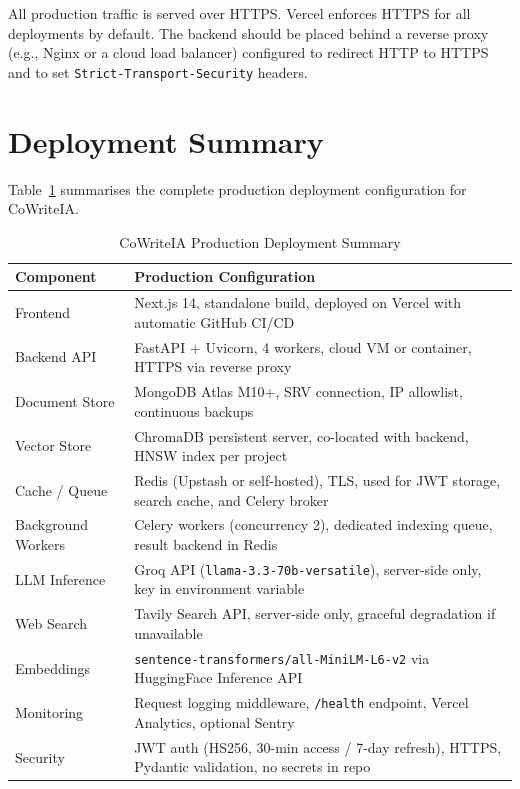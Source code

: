 All production traffic is served over HTTPS. Vercel enforces HTTPS for all deployments by default. The backend should be placed behind a reverse proxy (e.g., Nginx or a cloud load balancer) configured to redirect HTTP to HTTPS and to set \texttt{Strict-Transport-Security} headers.

\section{Deployment Summary}
\label{sec:deployment-summary}

Table~\ref{tab:deployment-summary} summarises the complete production deployment configuration for CoWriteIA.

\begin{table}[H]
\centering
\begin{tabular}{|p{4cm}|p{9.5cm}|}
\hline
\textbf{Component} & \textbf{Production Configuration} \\
\hline
Frontend & Next.js 14, standalone build, deployed on Vercel with automatic GitHub CI/CD \\
\hline
Backend API & FastAPI + Uvicorn, 4 workers, cloud VM or container, HTTPS via reverse proxy \\
\hline
Document Store & MongoDB Atlas M10+, SRV connection, IP allowlist, continuous backups \\
\hline
Vector Store & ChromaDB persistent server, co-located with backend, HNSW index per project \\
\hline
Cache / Queue & Redis (Upstash or self-hosted), TLS, used for JWT storage, search cache, and Celery broker \\
\hline
Background Workers & Celery workers (concurrency 2), dedicated indexing queue, result backend in Redis \\
\hline
LLM Inference & Groq API (\texttt{llama-3.3-70b-versatile}), server-side only, key in environment variable \\
\hline
Web Search & Tavily Search API, server-side only, graceful degradation if unavailable \\
\hline
Embeddings & \texttt{sentence-transformers/all-MiniLM-L6-v2} via HuggingFace Inference API \\
\hline
Monitoring & Request logging middleware, \texttt{/health} endpoint, Vercel Analytics, optional Sentry \\
\hline
Security & JWT auth (HS256, 30-min access / 7-day refresh), HTTPS, Pydantic validation, no secrets in repo \\
\hline
\end{tabular}
\caption{CoWriteIA Production Deployment Summary}
\label{tab:deployment-summary}
\end{table}
